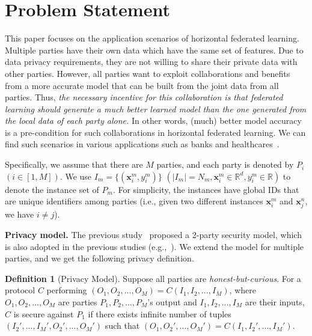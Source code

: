 \documentclass[letterpaper]{article} %
\theoremstyle{definition}
\newtheorem{definition}{Definition}
\newcommand{\del}[1]{}
\begin{document}
\section{Problem Statement}
This paper focuses on the application scenarios of horizontal federated learning. Multiple parties have their own data which have the same set of features. Due to data privacy requirements, they are not willing to share their private data with other parties. However, all parties want to exploit collaborations and benefits from a more accurate model that can be built from the joint data from all parties. Thus, \emph{the necessary incentive for this collaboration is that federated learning should generate a much better learned model than the one generated from the local data of each party alone.} In other words, (much) better model accuracy is a pre-condition for such collaborations in horizontal federated learning. We can find such scenarios in various applications such as banks and healthcares~\cite{Yang:2019:FML:3306498.3298981}.

Specifically, we assume that there are $M$ parties, and each party is denoted by $P_i$ $(i\in [1,M])$. We use $I_m = \{(\mathbf{x}_i^m, y_i^m)\}$ $(|I_m|=N_m, \mathbf{x}_i^m\in \mathbb{R}^d, y_i^m\in \mathbb{R})$ to denote the instance set of $P_m$. For simplicity, the instances have global IDs that are unique identifiers among parties (i.e., given two different instances $\mathbf{x}_i^m$ and $\mathbf{x}_j^n$, we have $i \neq j$).

{\bf Privacy model.} The previous study~\cite{du2004privacy} proposed a 2-party security model, which is also adopted in the previous studies (e.g.,~\cite{liu2018secure}). We extend the model for multiple parties, and we get the following privacy definition.

\begin{definition}[Privacy Model]
Suppose all parties are \textit{honest-but-curious}. For a protocol $C$ performing $(O_1, O_2, ..., O_M) = C(I_1, I_2, ..., I_M)$, where $O_1, O_2, ..., O_M$ are parties $P_1, P_2, ..., P_M$'s output and $I_1, I_2, ..., I_M$ are their inputs, $C$ is secure against $P_1$ if there exists infinite number of tuples $(I_2', ..., I_M', O_2', ..., O_M')$\del{ $(j \in [1,M],j\neq k)$} such that $(O_1, O_2', ..., O_M') = C(I_1, I_2', ..., I_M')$. 
\label{def:security}
\end{definition}
\end{document}
